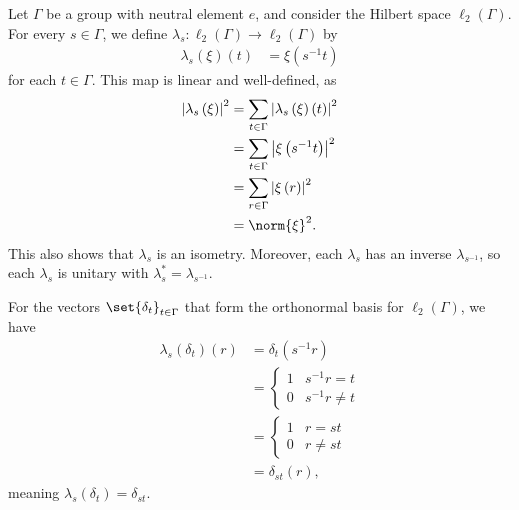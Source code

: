 \documentclass[10pt]{mypackage}
\begin{document}
\begin{example}
  Let $\Gamma$ be a group with neutral element $e$, and consider the Hilbert space $\ell_2\left(\Gamma\right)$. For every $s\in \Gamma$, we define $\lambda_s: \ell_2\left(\Gamma\right)\rightarrow \ell_2\left(\Gamma\right)$ by
  \begin{align*}
    \lambda_s\left(\xi\right)\left(t\right) &= \xi\left(s^{-1}t\right)
  \end{align*}
  for each $t\in \Gamma$. This map is linear and well-defined, as
  \begin{align*}
    \left\vert \lambda_s\left(\xi\right) \right\vert^2 &= \sum_{t\in \Gamma}\left\vert \lambda_s\left(\xi\right)\left(t\right) \right\vert^2\\
                                                       &= \sum_{t\in \Gamma}\left\vert \xi\left(s^{-1}t\right) \right\vert^2\\
                                                       &= \sum_{r\in \Gamma}\left\vert \xi\left(r\right) \right\vert^2\\
                                                       &= \norm{\xi}^2.
  \end{align*}
  This also shows that $\lambda_s$ is an isometry. Moreover, each $\lambda_s$ has an inverse $\lambda_{s^{-1}}$, so each $\lambda_s$ is unitary with $\lambda_s^{\ast} = \lambda_{s^{-1}}$.\newline

  For the vectors $\set{\delta_t}_{t\in \Gamma}$ that form the orthonormal basis for $\ell_2\left(\Gamma\right)$, we have
  \begin{align*}
    \lambda_s\left(\delta_t\right)\left(r\right) &= \delta_t\left(s^{-1}r\right)\\
                                                 &= \begin{cases}
                                                   1 & s^{-1}r = t\\
                                                   0 & s^{-1}r \neq t
                                                 \end{cases}\\
                                                 &= \begin{cases}
                                                   1 & r = st\\
                                                   0 & r \neq st
                                                 \end{cases}\\
                                                 &= \delta_{st}\left(r\right),
  \end{align*}
  meaning $\lambda_s\left(\delta_t\right) = \delta_{st}$.\newline


\end{example}
\end{document}
